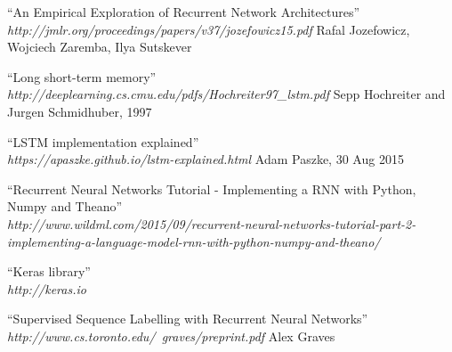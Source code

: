 \documentclass[twoside]{article}
\begin{document}
\begin{multicols}{2}
\begin{thebibliography}{99}
	``An Empirical Exploration of Recurrent Network Architectures'' \\
\emph{http://jmlr.org/proceedings/papers/v37/jozefowicz15.pdf}
	Rafal Jozefowicz, Wojciech Zaremba, Ilya Sutskever
	
	``Long short-term memory'' \\
\emph{http://deeplearning.cs.cmu.edu/pdfs/Hochreiter97\_lstm.pdf}
	Sepp Hochreiter and Jurgen Schmidhuber, 1997

    ``LSTM implementation explained'' \\
\emph{https://apaszke.github.io/lstm-explained.html} 
	Adam Paszke, 30 Aug 2015

    ``Recurrent Neural Networks Tutorial - Implementing a RNN with Python, Numpy and Theano'' \\ \emph{http://www.wildml.com/2015/09/recurrent-neural-networks-tutorial-part-2-implementing-a-language-model-rnn-with-python-numpy-and-theano/}

    ``Keras library'' \\
\emph{http://keras.io}

    ``Supervised Sequence Labelling with Recurrent Neural Networks''	\\	\emph{http://www.cs.toronto.edu/~graves/preprint.pdf} 
    Alex Graves

\end{thebibliography}


\end{multicols}
\end{document}
